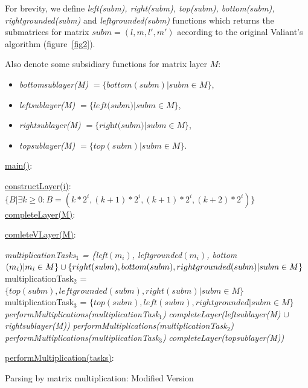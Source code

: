 For brevity, we define \textit{left(subm), right(subm), top(subm), bottom(subm), rightgrounded(subm)} and \textit{leftgrounded(subm)} functions which returns the submatrices for matrix $subm = (l, m, l', m')$ according to the original Valiant's algorithm (figure~\ref{fig2}).

Also denote some subsidiary functions for matrix layer $M$:
 \begin{itemize}
  \item \textit{bottomsublayer(M)} $ = \{bottom(subm) | subm \in M \}$,
  \item \textit{leftsublayer(M)} $ = \{\textit{left(subm)} | subm \in M \}$,
  \item \textit{rightsublayer(M)} $ =\{\textit{right(subm)} | subm \in M \}$,
  \item \textit{topsublayer(M)} $ = \{top(subm) | subm \in M \}$.
\end{itemize}

\begin{algorithm}[h!]
\SetAlgoNoLine
{}
\underline{main()}{:}{

 \BlankLine
 }

\underline{constructLayer(i)}{:}{
 \BlankLine
 $\{B | \exists k \geq 0 : B = (k*2^i, (k+1)*2^i, (k + 1)*2^i, (k+2)*2^i) \}$
 \BlankLine
    }
\underline{completeLayer(M)}{:}{
\BlankLine
{}
\BlankLine
}

\underline{comleteVLayer(M)}{:}{
 \BlankLine
 \textit{multiplicationTasks$_1$ = \{left$(m_i)$, leftgrounded$(m_i)$, bottom$(m_i) | m_i \in M \} \cup \linebreak  \{right(subm), bottom(subm), rightgrounded(subm) | subm \in M\}$\;}
 \BlankLine
 multiplicationTask$_2$ = $\{top(subm), leftgrounded(subm), right(subm) | subm \in M\}$\;
 \BlankLine
 multiplicationTask$_3$ = $\{top(subm), left(subm), rightgrounded |subm \in M\}$\;
 \BlankLine
 \textit{performMultiplications(multiplicationTask$_1$)}\;
 \textit{completeLayer(leftsublayer(M) $\cup$ rightsublayer(M))}\;
 \textit{performMultiplications(multiplicationTask$_2$)}\;
 \textit{performMultiplications(multiplicationTask$_3$)}\;
 \textit{completeLayer(topsublayer(M))}

 }
 \BlankLine

 \underline{performMultiplication(tasks)}{:}{\\
 }

\caption{Parsing by matrix multiplication: Modified Version}
\label{algo:modified}
\end{algorithm}

